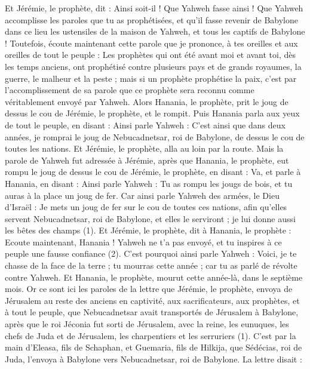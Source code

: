 \begin{multicols}{2}
Et Jérémie, le prophète, dit : Ainsi soit-il ! Que Yahweh fasse ainsi ! Que Yahweh accomplisse les paroles que tu as prophétisées, et qu'il fasse revenir de Babylone dans ce lieu les ustensiles de la maison de Yahweh, et tous les captifs de Babylone !
Toutefois, écoute maintenant cette parole que je prononce, à tes oreilles et aux oreilles de tout le peuple :
Les prophètes qui ont été avant moi et avant toi, dès les temps anciens, ont prophétisé contre plusieurs pays et de grands royaumes, la guerre, le malheur et la peste ;
mais si un prophète prophétise la paix, c’est par l’accomplissement de sa parole que ce prophète sera reconnu comme véritablement envoyé par Yahweh.
Alors Hanania, le prophète, prit le joug de dessus le cou de Jérémie, le prophète, et le rompit.
Puis Hanania parla aux yeux de tout le peuple, en disant : Ainsi parle Yahweh : C’est ainsi que dans deux années, je romprai le joug de Nebucadnetsar, roi de Babylone, de dessus le cou de toutes les nations. Et Jérémie, le prophète, alla au loin par la route.
Mais la parole de Yahweh fut adressée à Jérémie, après que Hanania, le prophète, eut rompu le joug de dessus le cou de Jérémie, le prophète, en disant :
Va, et parle à Hanania, en disant : Ainsi parle Yahweh : Tu as rompu les jougs de bois, et tu auras à la place un joug de fer.
Car ainsi parle Yahweh des armées, le Dieu d'Israël : Je mets un joug de fer sur le cou de toutes ces nations, afin qu'elles servent Nebucadnetsar, roi de Babylone, et elles le serviront ; je lui donne aussi les bêtes des champs\FTNT{} (1).
Et Jérémie, le prophète, dit à Hanania, le prophète : Ecoute maintenant, Hanania ! Yahweh ne t'a pas envoyé, et tu inspires à ce peuple une fausse confiance\FTNT{} (2).
C'est pourquoi ainsi parle Yahweh : Voici, je te chasse de la face de la terre ; tu mourras cette année ; car tu as parlé de révolte contre Yahweh.
Et Hanania, le prophète, mourut cette année-là, dans le septième mois.
\VerseOne{}Or ce sont ici les paroles de la lettre que Jérémie, le prophète, envoya de Jérusalem au reste des anciens en captivité, aux sacrificateurs, aux prophètes, et à tout le peuple, que Nebucadnetsar avait transportés de Jérusalem à Babylone,
après que le roi Jéconia fut sorti de Jérusalem, avec la reine, les eunuques, les chefs de Juda et de Jérusalem, les charpentiers et les serruriers\FTNT{} (1).
C’est par la main d’Eleasa, fils de Schaphan, et Guemaria, fils de Hilkija, que Sédécias, roi de Juda, l’envoya à Babylone vers Nebucadnetsar, roi de Babylone. La lettre disait :

\end{multicols}
